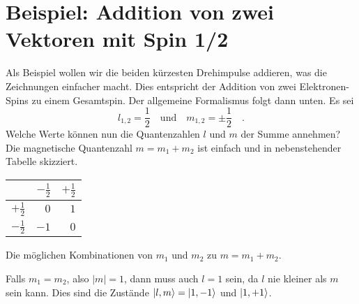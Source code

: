 \section*{Beispiel: Addition von zwei Vektoren mit Spin 1/2 }

Als Beispiel wollen wir die beiden kürzesten Drehimpulse addieren, was die Zeichnungen einfacher macht. Dies entspricht der Addition von zwei Elektronen-Spins zu einem Gesamtspin. Der allgemeine Formalismus folgt dann unten.
Es sei
\begin{equation}
l_{1,2} = \frac{1}{2} \quad \text{und} \quad m_{1,2} = \pm \frac{1}{2}  \quad .
\end{equation}
Welche Werte können nun die Quantenzahlen  $l$ und $m$ der Summe annehmen? Die magnetische Quantenzahl $m  = m_1 + m_2$ ist einfach und in nebenstehender Tabelle skizziert.
%
\begin{marginfigure}
\begin{tabular}{r|rr}
                           & $-\frac{1}{2} $  & $+\frac{1}{2} $ \\
                           \hline
 $+\frac{1}{2} $    &     $0$              & $1$ \\
 $-\frac{1}{2} $    &     $-1$              & $0$ 
\end{tabular}
\caption{Die möglichen Kombinationen von $m_1$ und $m_2$ zu $m = m_1 + m_2$.}
\end{marginfigure}
%
Falls $m_1 = m_2$, also $|m| = 1$, dann muss auch $l = 1$ sein, da $l$ nie kleiner als $m$ sein kann. Dies sind die Zustände $\ket{l, m} = \ket{1, -1} $ und $\ket{1, +1} $.

